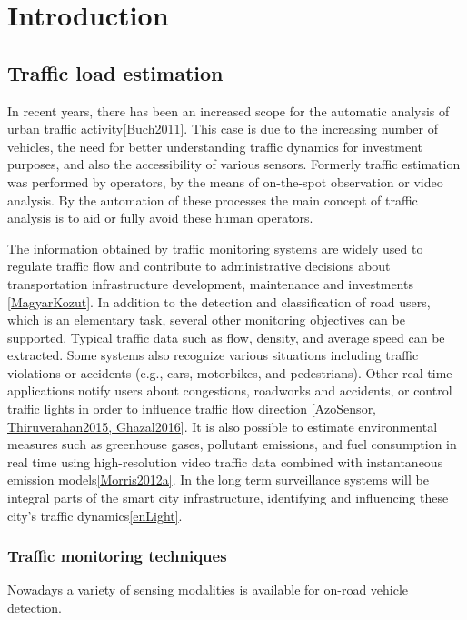 \chapter*{Introduction}
\section{Traffic load estimation}
In recent years, there has been an increased scope for the automatic analysis of urban traffic activity\ref{Buch2011}.
This case is due to the increasing number of vehicles, the need for better understanding traffic dynamics for investment purposes, and also the accessibility of various sensors.
Formerly traffic estimation was performed by operators, by the means of on-the-spot observation or video analysis.
By the automation of these processes the main concept of traffic analysis is to aid or fully avoid these human operators.

The information obtained by traffic monitoring systems are widely used to regulate traffic flow and contribute to administrative decisions about transportation infrastructure development, maintenance and investments \ref{MagyarKozut}.
In addition to the detection and classification of road users, which is an elementary task, several other monitoring objectives can be supported. 
Typical traffic data such as flow, density, and average speed can be extracted.
Some systems also recognize various situations including traffic violations or accidents (e.g., cars, motorbikes, and pedestrians).
Other real-time applications notify users about congestions, roadworks and accidents, or control traffic lights in order to influence traffic flow direction \ref{AzoSensor, Thiruverahan2015, Ghazal2016}.
It is also possible to estimate environmental measures such as greenhouse gases, pollutant emissions, and fuel consumption in real time using high-resolution video traffic data combined with instantaneous emission models\ref{Morris2012a}. 
In the long term surveillance systems will be integral parts of the smart city infrastructure, identifying and influencing these city's traffic dynamics\ref{enLight}.

\subsection{Traffic monitoring techniques}
Nowadays a variety of sensing modalities is available for on-road vehicle detection.

